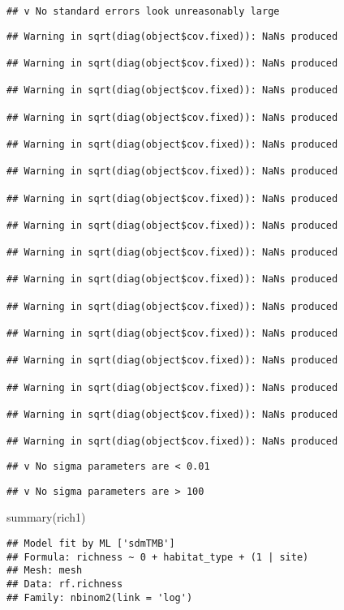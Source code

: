 \documentclass[
]{article}
\newenvironment{Shaded}{\begin{snugshade}}{\end{snugshade}}
\newcommand{\FunctionTok}[1]{\textcolor[rgb]{0.00,0.00,0.00}{#1}}
\newcommand{\NormalTok}[1]{#1}
\begin{document}
\begin{verbatim}
## v No standard errors look unreasonably large
\end{verbatim}

\begin{verbatim}
## Warning in sqrt(diag(object$cov.fixed)): NaNs produced

## Warning in sqrt(diag(object$cov.fixed)): NaNs produced

## Warning in sqrt(diag(object$cov.fixed)): NaNs produced

## Warning in sqrt(diag(object$cov.fixed)): NaNs produced

## Warning in sqrt(diag(object$cov.fixed)): NaNs produced

## Warning in sqrt(diag(object$cov.fixed)): NaNs produced

## Warning in sqrt(diag(object$cov.fixed)): NaNs produced

## Warning in sqrt(diag(object$cov.fixed)): NaNs produced

## Warning in sqrt(diag(object$cov.fixed)): NaNs produced

## Warning in sqrt(diag(object$cov.fixed)): NaNs produced

## Warning in sqrt(diag(object$cov.fixed)): NaNs produced

## Warning in sqrt(diag(object$cov.fixed)): NaNs produced

## Warning in sqrt(diag(object$cov.fixed)): NaNs produced

## Warning in sqrt(diag(object$cov.fixed)): NaNs produced

## Warning in sqrt(diag(object$cov.fixed)): NaNs produced

## Warning in sqrt(diag(object$cov.fixed)): NaNs produced
\end{verbatim}

\begin{verbatim}
## v No sigma parameters are < 0.01
\end{verbatim}

\begin{verbatim}
## v No sigma parameters are > 100
\end{verbatim}

\begin{Shaded}
\begin{Highlighting}[]
\FunctionTok{summary}\NormalTok{(rich1)}
\end{Highlighting}
\end{Shaded}

\begin{verbatim}
## Model fit by ML ['sdmTMB']
## Formula: richness ~ 0 + habitat_type + (1 | site)
## Mesh: mesh
## Data: rf.richness
## Family: nbinom2(link = 'log')
\end{verbatim}
\end{document}
